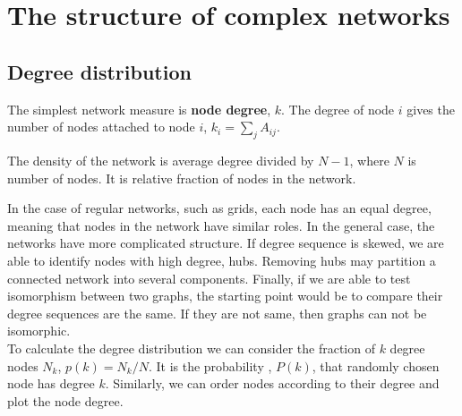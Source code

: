 \section{The structure of complex networks}


\subsection{Degree distribution}

The simplest network measure is \textbf{node degree}, $k$. The degree of node $i$ gives the number of nodes attached to node $i$, $k_i = \sum_j A_{ij}$. 

The density of the network is average degree divided by $N-1$, where $N$ is number of nodes. It is relative fraction of nodes in the network. 

In the case of regular networks, such as grids, each node has an equal degree, meaning that nodes in the network have similar roles. In the general case, the networks have more complicated structure. If degree sequence is skewed, we are able to identify nodes with high degree, hubs. Removing hubs may partition a connected network into several components. Finally, if we are able to test isomorphism between two graphs, the starting point would be to compare their degree sequences are the same. If they are not same, then graphs can not be isomorphic. \\

To calculate the degree distribution we can consider the fraction of $k$ degree nodes $N_k$, $p(k) = N_k/N$. It is the probability , $P(k)$, that randomly chosen node has degree $k$. Similarly, we can order nodes according to their degree and plot the node degree. \\


